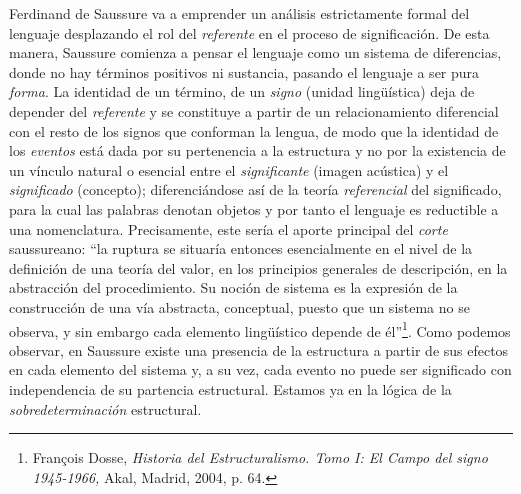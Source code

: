 Ferdinand de Saussure va a emprender un análisis estrictamente formal del lenguaje desplazando  el rol del \emph{referente} en el proceso de significación. De esta manera, Saussure comienza a pensar el lenguaje como un sistema de diferencias, donde no hay términos positivos ni sustancia, pasando el lenguaje a ser pura \emph{forma}. La identidad de un término, de un \emph{signo} (unidad lingüística) deja de depender del \emph{referente} y se constituye a partir de un relacionamiento diferencial con el resto de los signos que conforman la lengua, de modo que la identidad de los \emph{eventos} está dada por su pertenencia a la estructura y no por la existencia de un vínculo natural o esencial entre el \emph{significante} (imagen acústica) y el \emph{significado} (concepto); diferenciándose así de la teoría \emph{referencial} del significado, para la cual las palabras denotan objetos y por tanto el lenguaje es reductible a una nomenclatura. Precisamente, este sería el aporte principal del \emph{corte} saussureano: \enquote{la ruptura se situaría entonces esencialmente en el nivel de la definición de una teoría del valor, en los principios generales de descripción, en la abstracción del procedimiento. Su noción de sistema es la expresión de la construcción de una vía abstracta, conceptual, puesto que un sistema no se observa, y sin embargo cada elemento lingüístico depende de él}\footnote{François Dosse, \emph{Historia del Estructuralismo. Tomo I: El Campo del signo 1945-1966,} Akal, Madrid, 2004, p. 64.}. Como podemos observar, en Saussure existe una presencia de la estructura a partir de sus efectos en cada elemento del sistema y, a su vez, cada evento no puede ser significado con independencia de su partencia estructural. Estamos ya  en la lógica de la \emph{sobredeterminación} estructural.

